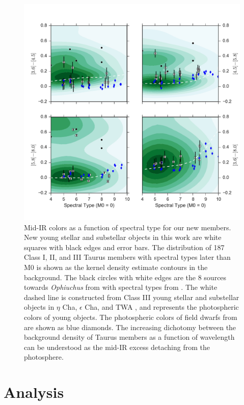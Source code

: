 \begin{figure}[ht!]
  \caption{ Mid-IR colors as a function of spectral type for our new members.  New young stellar and substellar objects in this work are white squares with black edges and error bars.  The distribution of 187 Class I, II, and III Taurus members with spectral types later than M0 \citep{2010ApJS..186..111L} is shown as the kernel density estimate contours in the background.  The black circles with white edges are the 8 sources towards \emph{Ophiuchus} from \citet{allers06} with spectral types from \citet{2011ASPC..448..633G}.  The white dashed line is constructed from Class III young stellar and substellar objects in $\eta$ Cha, $\epsilon$ Cha, and TWA \citep{2010ApJS..186..111L}, and represents the photospheric colors of young objects.  The photospheric colors of field dwarfs from \citet{2006ApJ...651..502P} are shown as blue diamonds. 
  The increasing dichotomy between the background density of Taurus members as a function of wavelength can be understood as the mid-IR excess detaching from the photosphere.    \label{fig_midIR_results} }
\centering
\includegraphics[scale=0.6]{chIMACS/figures/midIR_phot_results.pdf}
\end{figure}

\section{Analysis}
